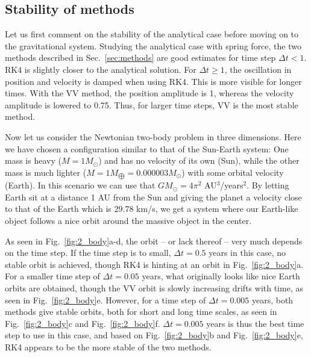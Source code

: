 \documentclass{article}
\begin{document}
\begin{multicols}{2}
\subsection{Stability of methods}

Let us first comment on the stability of the analytical case before moving on to the gravitational system. Studying the analytical case with spring force, the two methods described in Sec.~\ref{sec:methods} are good estimates for time step $\Delta t<1$. RK4 is slightly closer to the analytical solution. For $\Delta t \geqslant 1$, the oscillation in position and velocity is damped when using RK4. This is more visible for longer times. With the VV method, the position amplitude is 1, whereas the velocity amplitude is lowered to 0.75. Thus, for larger time steps, VV is the most stable method.

Now let us consider the Newtonian two-body problem in three dimensions. Here we have chosen a configuration similar to that of the Sun-Earth system: One mass is heavy ($M = 1 M_{\odot}$) and has no velocity of its own (Sun), while the other mass is much lighter ($M = 1 M_{\bigoplus} = 0.000003 M_{\odot}$) with some orbital velocity (Earth). In this scenario we can use that $GM_{\odot} = 4\pi^2$ AU$^3$/years$^2$. By letting Earth sit at a distance 1 AU from the Sun and giving the planet a velocity close to that of the Earth which is 29.78 km/s, we get a system where our Earth-like object follows a nice orbit around the massive object in the center. 

As seen in Fig.~\ref{fig:2_body}a-d, the orbit -- or lack thereof -- very much depends on the time step. If the time step is to small, $\Delta t = 0.5$ years in this case, no stable orbit is achieved, though RK4 is hinting at an orbit in Fig.~\ref{fig:2_body}a. For a smaller time step of $\Delta t = 0.05$ years, what originally looks like nice Earth orbits are obtained, though the VV orbit is slowly increasing drifts with time, as seen in Fig.~\ref{fig:2_body}e. However, for a time step of $\Delta t = 0.005$ years, both methods give stable orbits, both for short and long time scales, as seen in Fig.~\ref{fig:2_body}c and Fig.~\ref{fig:2_body}f. $\Delta t = 0.005$ years is thus the best time step to use in this case, and based on Fig.~\ref{fig:2_body}b and Fig.~\ref{fig:2_body}e, RK4 appears to be the more stable of the two methods.


\end{multicols}
\end{document}
